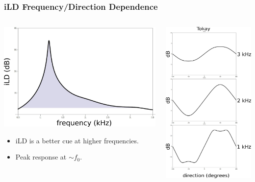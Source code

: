 \documentclass{beamer}
\begin{document}
\begin{frame}[t]
\frametitle{iLD Frequency/Direction Dependence}
\begin{columns}
\begin{column}{0.5\textwidth}
 \includegraphics[width = 6 cm]{Diagrams/Presentation/iLDspectrum.png}
\begin{exampleblock}{}
\small
 \begin{itemize}
  \item iLD is a better cue at higher frequencies.
  \item Peak response at $\sim f_0$.
 \end{itemize}
\end{exampleblock}
\end{column}
     \begin{column}{0.5\textwidth}
     \flushright
 \includegraphics[width = 3.6 cm]{Diagrams/Presentation/iLDdirection.png}
\end{column}
\end{columns}
\end{frame}
\end{document}
